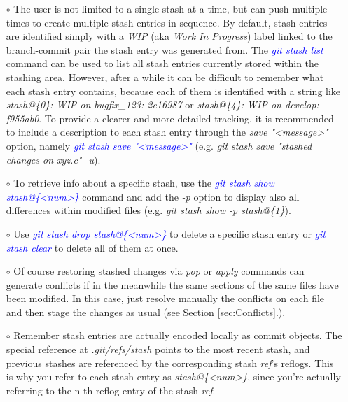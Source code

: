 \documentclass[a4paper,portrait,10pt]{article}   %
\newcommand{\mycmd}[1]{\textcolor{blue}{\textit{#1}}}   %
\newcommand{\myvspace}{\vspace{4mm}}   %
\newcommand{\mysecref}[1]{\hyperref[#1]{\ref{#1}.}}   %
\begin{document}
\begin{itemize}
\item[$\circ$] The user is not limited to a single stash at a time, but can push multiple times to create multiple stash entries in sequence. By default, stash entries are identified simply with a \textit{WIP} (aka \textit{Work In Progress}) label linked to the branch-commit pair the stash entry was generated from. The \mycmd{git stash list} command can be used to list all stash entries currently stored within the stashing area. However, after a while it can be difficult to remember what each stash entry contains, because each of them is identified with a string like \textit{stash@\{0\}: WIP on bugfix\_123: 2e16987} or \textit{stash@\{4\}: WIP on develop: f955ab0}. To provide a clearer and more detailed tracking, it is recommended to include a description to each stash entry through the \textit{save "<message>"} option, namely \mycmd{git stash save "<message>"} (e.g. \textit{git stash save "stashed changes on xyz.c" -u}).
\myvspace

\item[$\circ$] To retrieve info about a specific stash, use the \mycmd{git stash show stash@\{<num>\}} command and add the \textit{-p} option to display also all differences within modified files (e.g. \textit{git stash show -p stash@\{1\}}).
\myvspace

\item[$\circ$] Use \mycmd{git stash drop stash@\{<num>\}} to delete a specific stash entry or \mycmd{git stash clear} to delete all of them at once.
\myvspace

\item[$\circ$] Of course restoring stashed changes via \textit{pop} or \textit{apply} commands can generate conflicts if in the meanwhile the same sections of the same files have been modified. In this case, just resolve manually the conflicts on each file and then stage the changes as usual (see Section \mysecref{sec:Conflicts}).
\myvspace

\item[$\circ$] Remember stash entries are actually encoded locally as commit objects. The special reference at \textit{.git/refs/stash} points to the most recent stash, and previous stashes are referenced by the corresponding stash \textit{ref}'s reflogs. This is why you refer to each stash entry as \textit{stash@\{<num>\}}, since you're actually referring to the n-th reflog entry of the stash \textit{ref}.
\myvspace


\end{itemize}
\end{document}
